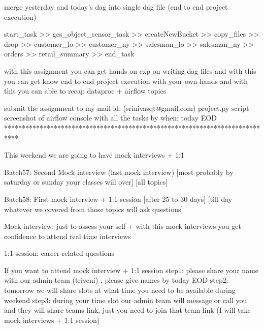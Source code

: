 	merge yesterday and today's dag into single dag file (end to end project execution)
	
	start_task >> gcs_object_sensor_task >> createNewBucket >> copy_files >> drop >> customer_lo >> customer_ny >> salesman_lo >> salesman_ny >> orders >> retail_summary >> end_task
	
	with this assignment you can get hands on exp on writing dag files and with this you can get know end to end project execution with your own hands  and with this you can able to recap dataproc + airflow topics 
	
	
	submit the assignment to my mail id: (srinivasqt@gmail.com) 
			project.py script
			screenshot of airflow console with all the tasks
	by when: today EOD
****************************************************************************

This weekend we are going to have mock interviews + 1:1

Batch57: Second Mock interview (last mock interview) [most probably by saturday or sunday your classes will over]  [all topics]

Batch58: First mock interview + 1:1 session [after 25 to 30 days]  [till day whatever we covered from those topics will ask questions]


Mock interview: just to assess your self + with this mock interviews you get confidence to attend real time interviews

1:1 session: career related questions 

If you want to attend mock interview + 1:1 session 
step1: please share your name with our admin team (triveni) , please give names by today EOD 
step2: tomorrow we will share slots at what time you need to be available during weekend
step3: during your time slot our admin team will message or call you and they will share teams link, just you need to join that team link (I will take mock interviews + 1:1 session)
